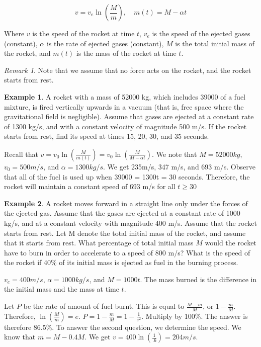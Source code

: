 \documentclass[11pt]{article}
\theoremstyle{plain} %
\theoremstyle{definition}
\theoremstyle{example}
\newtheorem*{example}{Example}
\theoremstyle{remark}
\newtheorem*{remark}{Remark}
\begin{document}
	$$v = v_e \ln \left({\frac{M}{m}}\right), \quad m(t) = M - \alpha t$$ 
	
Where $v$ is the speed of the rocket at time $t$, $v_e$ is the speed of the ejected gases (constant), $\alpha$ is the rate of ejected gases (constant), $M$ is the total initial mass of the rocket, and $m(t)$ is the mass of the rocket at time $t$. 
	\begin{remark}
	Note that we assume that no force acts on the rocket, and the rocket starts from rest.
	\end{remark}


\begin{example}
A rocket with a mass of 52000 kg, which includes 39000 of a fuel mixture, is fired vertically upwards in a vacuum (that is, free space where the gravitational field is negligible). Assume that gases are ejected at a constant rate of 1300 kg/s, and with a constant velocity of magnitude 500 m/s. If the rocket starts from rest, find its speed at times 15, 20, 30, and 35 seconds. 
\end{example}

Recall that $v = v_0 \ln \left({\frac{M}{m(t)}}\right) = v_0 \ln \left({\frac{M}{M - \alpha t}}\right)$. We note that $M = 52000kg$, $v_0=500m/s$, and $\alpha = 1300kg/s$. We get 235m/s, 347 m/s, and 693 m/s. Observe that all of the fuel is used up when 39000 = 1300t = 30 seconds. Therefore, the rocket will maintain a constant speed of 693 m/s for all $t \geq 30$

\begin{example}
A rocket moves forward in a straight line only under the forces of the ejected gas. Assume that the gases are ejected at a constant rate of 1000 kg/s, and at a constant velocity with magnitude 400 m/s. Assume that the rocket starts from rest. Let M denote the total initial mass of the rocket, and assume that it starts from rest. What percentage of total initial mass $M$ would the rocket have to burn in order to accelerate to a speed of 800 m/s? What is the speed of the rocket if 40\% of its initial mass is ejected as fuel in the burning process. 
\end{example}

$v_e = 400 m/s$, $\alpha = 1000 kg/s$, and $M = 1000t$. The mass burned is the difference in the initial mass and the mass at time $t$. 

Let $P$ be the rate of amount of fuel burnt. This is equal to $\frac{M-m}{M}$, or $1-\frac{m}{M}$. Therefore, $\ln \left({\frac{M}{m}}\right) = e$. $P = 1-\frac{m}{M} = 1-\frac{1}{e^2}$. Multiply by 100\%. The answer is therefore 86.5\%. To answer the second question, we determine the speed. We know that $m = M - 0.4M$. We get $v = 400 \ln \left({\frac{1}{.6}}\right) = 204 m/s$.
\end{document}
